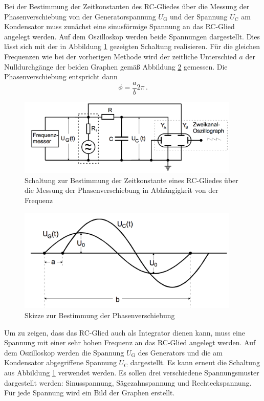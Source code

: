 Bei der Bestimmung der Zeitkonstanten des RC-Gliedes über die Messung der Phasenverschiebung
von der Generatorspannung $U_{\text{G}}$ und der Spannung $U_{\text{C}}$ am Kondensator
muss zunächst eine sinusförmige Spannung an das RC-Glied angelegt werden.
Auf dem Oszilloskop werden beide Spannungen dargestellt. Dies lässt sich mit der in Abbildung \ref{fig:Schaltung_4c}
gezeigten Schaltung realisieren. Für die gleichen Frequenzen wie bei der vorherigen
Methode wird der zeitliche Unterschied $a$ der Nulldurchgänge der beiden Graphen gemäß Abbildung
\ref{fig:phasenverschiebung} gemessen. Die Phasenverschiebung entspricht dann
\begin{equation}
  \phi=\frac{a}{b}2\pi\,.
  \label{eqn:ab2phi}
\end{equation}

\begin{figure}
  \centering
  \includegraphics[width=300pt]{data/4c_schaltung.png}
  \caption{Schaltung zur Bestimmung der Zeitkonstante eines RC-Gliedes über die Messung
  der Phasenverschiebung in Abhängigkeit von der Frequenz \cite{Versuchsanleitung}}
  \label{fig:Schaltung_4c}
\end{figure}

\begin{figure}
  \centering
  \includegraphics[width=300pt]{data/phasenverschiebung.png}
  \caption{Skizze zur Bestimmung der Phasenverschiebung \cite{Versuchsanleitung}}
  \label{fig:phasenverschiebung}
\end{figure}

Um zu zeigen, dass das RC-Glied auch als Integrator dienen kann, muss eine Spannung
mit einer sehr hohen Frequenz an das RC-Glied angelegt werden.
Auf dem Oszilloskop werden die Spannung $U_{\text{G}}$ des Generators und
die am Kondensator abgegriffene Spannung $U_{\text{C}}$ dargestellt. Es kann erneut die Schaltung
aus Abbildung \ref{fig:Schaltung_4c} verwendet werden. Es sollen drei verschiedene
Spannungsmuster dargestellt werden: Sinusspannung, Sägezahnspannung und Rechteckspannung.
Für jede Spannung wird ein Bild der Graphen erstellt.
